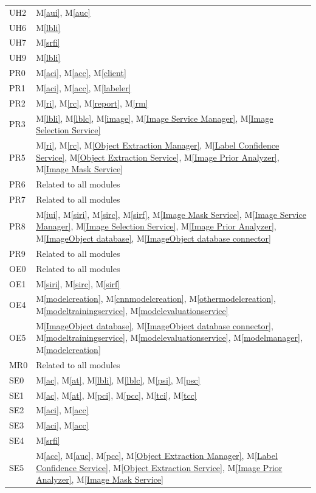 \documentclass[12pt, titlepage]{article}
\newcommand{\mref}[1]{M\ref{#1}}
\begin{document}
\begin{longtable}{p{} p{}}
  UH2 & \mref{aui}, \mref{auc} \\
  UH6 & \mref{lbli} \\
  UH7 & \mref{srfi} \\
  UH9 & \mref{lbli} \\
  PR0 & \mref{aci}, \mref{acc}, \mref{client} \\
  PR1 & \mref{aci}, \mref{acc}, \mref{labeler} \\
  PR2 & \mref{ri}, \mref{rc}, \mref{report}, \mref{rm} \\
  PR3 & \mref{lbli}, \mref{lblc}, \mref{image}, \mref{Image Service Manager}, \mref{Image Selection Service} \\
  PR5 &  \mref{ri}, \mref{rc}, \mref{Object Extraction Manager}, \mref{Label Confidence Service}, \mref{Object Extraction Service}, \mref{Image Prior Analyzer}, \mref{Image Mask Service}\\
  PR6 & Related to all modules \\
  PR7 & Related to all modules \\
  PR8 & \mref{iui}, \mref{siri}, \mref{sirc}, \mref{sirf}, \mref{Image Mask Service}, \mref{Image Service Manager}, \mref{Image Selection Service}, \mref{Image Prior Analyzer}, \mref{ImageObject database}, \mref{ImageObject database connector} \\
  PR9 & Related to all modules \\
  OE0 & Related to all modules \\
  OE1 & \mref{siri}, \mref{sirc}, \mref{sirf} \\
  OE4 &  \mref{modelcreation}, \mref{cnnmodelcreation}, \mref{othermodelcreation}, \mref{modeltrainingservice}, \mref{modelevaluationservice} \\
  OE5 &  \mref{ImageObject database}, \mref{ImageObject database connector}, \mref{modeltrainingservice}, \mref{modelevaluationservice}, \mref{modelmanager}, \mref{modelcreation}\\
  MR0 & Related to all modules \\
  SE0 & \mref{ac}, \mref{at}, \mref{lbli}, \mref{lblc}, \mref{psi}, \mref{psc} \\
  SE1 & \mref{ac}, \mref{at}, \mref{pci}, \mref{pcc}, \mref{tci}, \mref{tcc} \\
  SE2 & \mref{aci}, \mref{acc} \\
  SE3 & \mref{aci}, \mref{acc} \\
  SE4 & \mref{srfi} \\
  SE5 & \mref{acc}, \mref{auc}, \mref{pcc}, \mref{Object Extraction Manager}, \mref{Label Confidence Service}, \mref{Object Extraction Service}, \mref{Image Prior Analyzer}, \mref{Image Mask Service}\\

\end{longtable}
\end{document}
